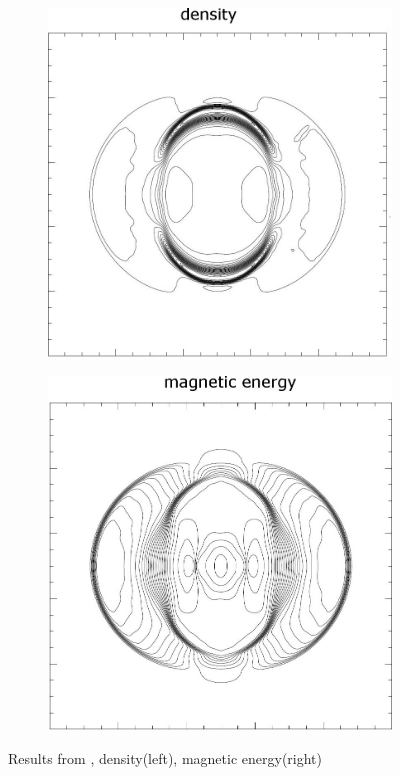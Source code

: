 \begin{figure}[H]
\centering
\hspace{-8mm}
\begin{subfigure}[b]{0.4\textwidth}\includegraphics[width=\textwidth]{img/mhd-blast/old/ref.jpg}\end{subfigure}
\begin{subfigure}[b]{0.395\textwidth}\includegraphics[width=\textwidth]{img/mhd-blast/old/refmag.jpg}\end{subfigure}
\caption{Results from \cite{blast1}, density(left), magnetic energy(right)}
\label{figure:blastOldRef}
\end{figure}

